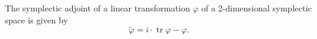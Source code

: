 The symplectic adjoint of a linear transformation $\varphi$ of a 2-dimensional symplectic space is given by
$$\tilde{\varphi} = i \cdot \operatorname{tr} \varphi - \varphi.$$
